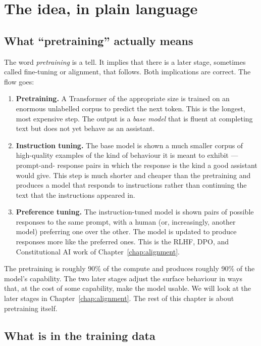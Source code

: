 \section{The idea, in plain language}

\subsection*{What ``pretraining'' actually means}

The word \emph{pretraining} is a tell. It implies that there is
a later stage, sometimes called fine-tuning or alignment, that
follows. Both implications are correct. The flow goes:

\begin{enumerate}
  \item \textbf{Pretraining.} A Transformer of the appropriate
        size is trained on an enormous unlabelled corpus to
        predict the next token. This is the longest, most
        expensive step. The output is a \emph{base model} that
        is fluent at completing text but does not yet behave as
        an assistant.
  \item \textbf{Instruction tuning.} The base model is shown a
        much smaller corpus of high-quality examples of the kind
        of behaviour it is meant to exhibit --- prompt-and-
        response pairs in which the response is the kind a good
        assistant would give. This step is much shorter and
        cheaper than the pretraining and produces a model that
        responds to instructions rather than continuing the text
        that the instructions appeared in.
  \item \textbf{Preference tuning.} The instruction-tuned model
        is shown pairs of possible responses to the same prompt,
        with a human (or, increasingly, another model) preferring
        one over the other. The model is updated to produce
        responses more like the preferred ones. This is the
        RLHF, DPO, and Constitutional AI work of Chapter~\ref{chap:alignment}.
\end{enumerate}

The pretraining is roughly 90\% of the compute and produces
roughly 90\% of the model's capability. The two later stages
adjust the surface behaviour in ways that, at the cost of some
capability, make the model usable. We will look at the later
stages in Chapter~\ref{chap:alignment}. The rest of this chapter is about
pretraining itself.

\subsection*{What is in the training data}

